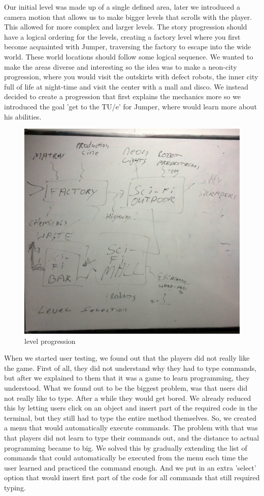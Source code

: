 \documentclass[a4paper,twoside,12pt]{article}
\begin{document}
Our initial level was made up of a single defined area, later we introduced a camera motion that allows us to make bigger levels that scrolls with the player. This allowed for more complex and larger levels.
The story progression should have a logical ordering for the levels, creating a factory level where you first become acquainted with Jumper, traversing the factory to escape into the wide world. These world locations should follow some logical sequence. We wanted to make the areas diverse and interesting so the idea was to make a neon-city progression, where you would visit the outskirts with defect robots, the inner city full of life at night-time and visit the center with a mall and disco. We instead decided to create a progression that first explains the mechanics more so we introduced the goal 'get to the TU/e' for Jumper, where would learn more about his abilities.
\begin{figure}[H]
\includegraphics[scale=0.2]{locations}
\caption{level progression}
\end{figure}
When we started user testing, we found out that the players did not really like the game. First of all, they did not understand why they had to type commands, but after we explained to them that it was a game to learn programming, they understood. What we found out to be the biggest problem, was that users did not really like to type. After a while they would get bored. We already reduced this by letting users click on an object and insert part of the required code in the terminal, but they still had to type the entire method themselves. So, we created a menu that would automatically execute commands. The problem with that was that players did not learn to type their commands out, and the distance to actual programming became to big. We solved this by gradually extending the list of commands that could automatically be executed from the menu each time the user learned and practiced the command enough. And we put in an extra 'select' option that would insert first part of the code for all commands that still required typing. 
\end{document}
